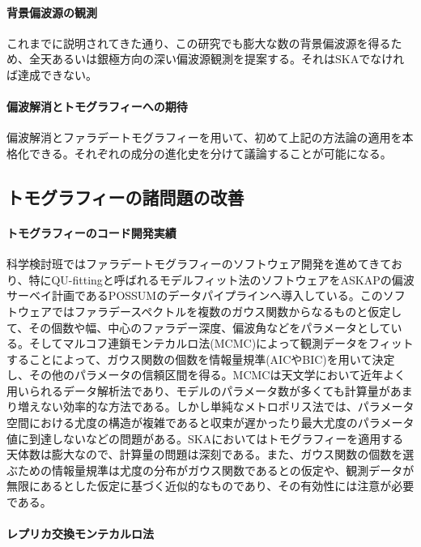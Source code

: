 \paragraph{背景偏波源の観測}

これまでに説明されてきた通り、この研究でも膨大な数の背景偏波源を得るため、全天あるいは銀極方向の深い偏波源観測を提案する。それはSKAでなければ達成できない。

\paragraph{偏波解消とトモグラフィーへの期待}

偏波解消とファラデートモグラフィーを用いて、初めて上記の方法論の適用を本格化できる。それぞれの成分の進化史を分けて議論することが可能になる。


\subsection{トモグラフィーの諸問題の改善}
\label{c06.s3.ss12}

\paragraph{トモグラフィーのコード開発実績}

科学検討班ではファラデートモグラフィーのソフトウェア開発を進めてきており、特にQU-fittingと呼ばれるモデルフィット法のソフトウェアをASKAPの偏波サーベイ計画であるPOSSUMのデータパイプラインへ導入している。このソフトウェアではファラデースペクトルを複数のガウス関数からなるものと仮定して、その個数や幅、中心のファラデー深度、偏波角などをパラメータとしている。そしてマルコフ連鎖モンテカルロ法(MCMC)によって観測データをフィットすることによって、ガウス関数の個数を情報量規準(AICやBIC)を用いて決定し、その他のパラメータの信頼区間を得る。MCMCは天文学において近年よく用いられるデータ解析法であり、モデルのパラメータ数が多くても計算量があまり増えない効率的な方法である。しかし単純なメトロポリス法では、パラメータ空間における尤度の構造が複雑であると収束が遅かったり最大尤度のパラメータ値に到達しないなどの問題がある。SKAにおいてはトモグラフィーを適用する天体数は膨大なので、計算量の問題は深刻である。また、ガウス関数の個数を選ぶための情報量規準は尤度の分布がガウス関数であるとの仮定や、観測データが無限にあるとした仮定に基づく近似的なものであり、その有効性には注意が必要である。

\paragraph{レプリカ交換モンテカルロ法}

